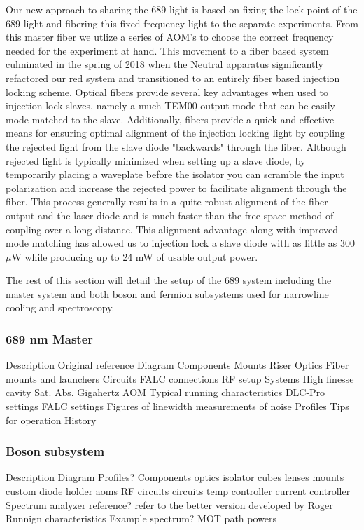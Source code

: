 Our new approach to sharing the 689 light is based on fixing the lock point of the 689 light and fibering this fixed frequency light to the separate experiments. From this master fiber we utlize a series of AOM's to choose the correct frequency needed for the experiment at hand. This movement to a fiber based system culminated in the spring of 2018 when the Neutral apparatus significantly refactored our red system and transitioned to an entirely fiber based injection locking scheme. Optical fibers provide several key advantages when used to injection lock slaves, namely a much TEM00 output mode that can be easily mode-matched to the slave. Additionally, fibers provide a quick and effective means for ensuring optimal alignment of the injection locking light by coupling the rejected light from the slave diode "backwards" through the fiber. Although rejected light is typically minimized when setting up a slave diode, by temporarily placing a waveplate before the isolator you can scramble the input polarization and increase the rejected power to facilitate alignment through the fiber. This process generally results in a quite robust alignment of the fiber output and the laser diode and is much faster than the free space method of coupling over a long distance. This alignment advantage along with improved mode matching has allowed us to injection lock a slave diode with as little as 300 $\mu$W while producing up to 24 mW of usable output power.

The rest of this section will detail the setup of the 689 system including the master system and both boson and fermion subsystems used for narrowline cooling and spectroscopy.
	
\subsubsection{689 nm Master}

Description
	Original reference
Diagram
Components
	Mounts
		Riser
	Optics
		Fiber mounts and launchers
	Circuits
		FALC connections
		RF setup
	Systems
		High finesse cavity
		Sat. Abs. 
		Gigahertz AOM
Typical running characteristics
	DLC-Pro settings
	FALC settings
		Figures of linewidth
		measurements of noise
Profiles
Tips for operation
History

\subsubsection{Boson subsystem}

Description
Diagram
	Profiles?
Components
	optics
		isolator
		cubes
		lenses
	mounts
		custom diode holder
	aoms
		RF circuits
	circuits
		temp controller
		current controller
	Spectrum analyzer
		reference?
		refer to the better version developed by Roger
Runnign characteristics
	Example spectrum?
	MOT path powers


